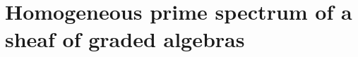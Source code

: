 \section{Homogeneous prime spectrum of a sheaf of graded algebras}
\label{section-homogeneous-prime-spectrum-sheaf-of-graded-algebras}

